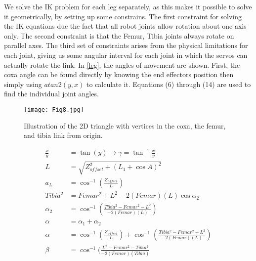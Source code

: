 We solve the IK problem for each leg separately, as this makes it possible to solve it geometrically, by setting up some constrains. The first constraint for solving the IK equations due the fact that all robot joints allow rotation about one axis only. The second constraint is that the Femur, Tibia joints always rotate on parallel axes. The third set of constraints arises from the physical limitations for each joint, giving us some angular interval for each joint in which the servos can actually rotate the link. In \ref{leg}, the angles of movement are shown.
First, the coxa angle can be found directly by knowing the end effectors position then simply using $atan2(y,x)$ to calculate it. Equations (6) through (14) are used to find the individual joint angles.
\begin{figure}[h]
	\centering
	\texttt{[image: Fig8.jpg]}
	\caption{ Illustration of the 2D triangle with vertices in the coxa, the femur, and tibia link from origin.}
	\label{fig8}
\end{figure}

\begin{align}
    \frac{x}{y} & =\tan (y)\to \gamma =\tan ^{-1}\frac{x}{y} \\
    L              & = \sqrt{Z_{offset}^{2}+(L_{1}+\cos A)^{2}}\\
    a_{L}        & = \cos ^{-1}(\frac{Z_{offset}}{L})\\
    Tibia^{2}  & =Femar^{2}+L^{2}-2(Femar)(L)\cos \alpha _{2} \\
    \alpha _{2} & =\cos^{-1}(\frac{Tibia^{2}-Femar^{2}-L^{2}}{-2(Femar)(L)}) \\
    \alpha      & =\alpha _{1}+\alpha _{2}\\
    \alpha      & = \cos ^{-1}(\frac{Z_{offset}}{L})+\cos ^{-1}(\frac{Tibia^{2}-Femar^{2}-L^{2}}{-2(Femar)(L)}) \\
    \beta        & = \cos^{-1}(\frac{L^{2}-Femar^{2}-Tibia^{2}}{-2(Femar)(Tibia)}
\end{align}